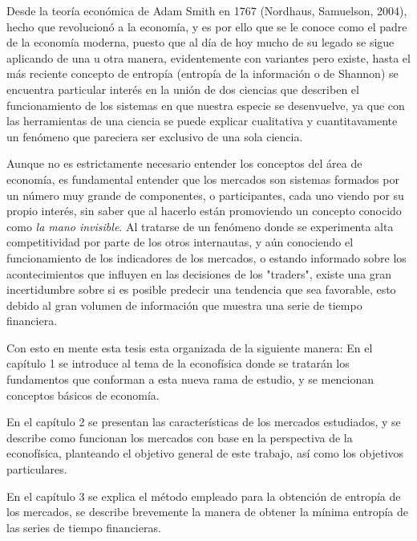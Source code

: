 Desde la teor\'ia econ\'omica de Adam Smith en 1767 (Nordhaus, Samuelson, 2004), hecho que revolucion\'o a la econom\'ia, y es por ello que se le conoce como el padre de la econom\'ia moderna, puesto que al d\'ia de hoy mucho de su legado se sigue aplicando de una u otra manera, evidentemente con variantes pero existe, hasta el más reciente concepto de entropía (entropía de la información o de Shannon) se encuentra particular interés en la unión de dos ciencias que describen el funcionamiento de los sistemas en que nuestra especie se desenvuelve, ya que con las herramientas de una ciencia se puede explicar cualitativa y cuantitavamente un fenómeno que pareciera ser exclusivo de una sola ciencia.
\newline

Aunque no es estrictamente necesario entender los conceptos del \'area de econom\'ia, es fundamental entender que los mercados son sistemas formados por un n\'umero muy grande de componentes, o participantes, cada uno viendo por su propio inter\'es, sin saber que al hacerlo est\'an promoviendo un concepto conocido como \textit{la mano invisible}. Al tratarse de un fen\'omeno donde se experimenta alta competitividad por parte de los otros internautas, y a\'un conociendo el funcionamiento de los indicadores de los mercados, o estando informado sobre los acontecimientos que influyen en las decisiones de los "traders", existe una gran incertidumbre sobre si es posible predecir una tendencia que sea favorable, esto debido al gran volumen de información que muestra una serie de tiempo financiera. 
\newline

Con esto en mente esta tesis esta organizada de la siguiente manera:\newline 
En el capítulo 1 se introduce al tema de la econofísica donde se tratarán los fundamentos que conforman a esta nueva rama de estudio, y se mencionan conceptos básicos de economía.
\newline

En el capítulo 2 se presentan las características de los mercados estudiados, y se describe como funcionan los mercados con base en la perspectiva de la econofísica, planteando el objetivo general de este trabajo, así como los objetivos particulares.\newline

En el capítulo 3 se explica el método empleado para la obtención de entropía de los mercados, se describe brevemente la manera de obtener la mínima entropía de las series de tiempo financieras.
\newline

